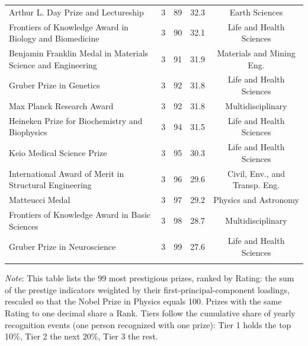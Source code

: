 \begin{longtable}{>{\raggedright\arraybackslash}p{7.2cm}cccc}
Arthur L. Day Prize and Lectureship & 3 & 89 & 32.3 & Earth Sciences \\ 
Frontiers of Knowledge Award in Biology and Biomedicine & 3 & 90 & 32.1 & Life and Health Sciences \\ 
Benjamin Franklin Medal in Materials Science and Engineering & 3 & 91 & 31.9 & Materials and Mining Eng. \\ 
Gruber Prize in Genetics & 3 & 92 & 31.8 & Life and Health Sciences \\ 
Max Planck Research Award & 3 & 92 & 31.8 & Multidisciplinary \\ 
Heineken Prize for Biochemistry and Biophysics & 3 & 94 & 31.5 & Life and Health Sciences \\ 
Keio Medical Science Prize & 3 & 95 & 30.3 & Life and Health Sciences \\ 
International Award of Merit in Structural Engineering & 3 & 96 & 29.6 & Civil, Env., and Transp. Eng. \\ 
Matteucci Medal & 3 & 97 & 29.2 & Physics and Astronomy \\ 
Frontiers of Knowledge Award in Basic Sciences & 3 & 98 & 28.7 & Multidisciplinary \\ 
Gruber Prize in Neuroscience & 3 & 99 & 27.6 & Life and Health Sciences \\ 
\hline \\[-1.8ex] 
\end{longtable} 

\noindent \footnotesize \textit{Note}: This table lists the 99 most prestigious prizes, ranked by Rating: the sum of the prestige indicators weighted by their first-principal-component loadings, rescaled so that the Nobel Prize in Physics equals 100. Prizes with the same Rating to one decimal share a Rank. Tiers follow the cumulative share of yearly recognition events (one person recognized with one prize): Tier 1 holds the top 10\%, Tier 2 the next 20\%, Tier 3 the rest.
